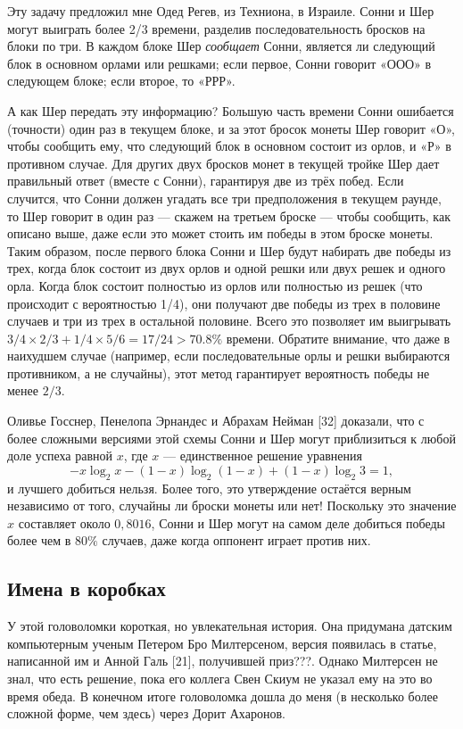 Эту задачу предложил мне Одед Регев, из Техниона, в Израиле.
Сонни и Шер могут выиграть более 2/3 времени, разделив последовательность бросков на блоки по три.
В каждом блоке Шер \emph{сообщает} Сонни, является ли следующий блок в основном орлами или решками;
если первое, Сонни говорит «ООО» в следующем блоке; если второе, то «РРР».

А как Шер передать эту информацию?
Большую часть времени Сонни ошибается (точности) один раз в текущем блоке, и за этот бросок монеты Шер говорит «О», чтобы сообщить ему, что следующий блок в основном состоит из орлов, и «Р» в противном случае.
Для других двух бросков монет в текущей тройке Шер дает правильный ответ (вместе с Сонни), гарантируя две из трёх побед.
Если случится, что Сонни должен угадать все три предположения в текущем раунде, то Шер говорит в один раз --- скажем на третьем броске --- чтобы сообщить, как описано выше, даже если это может стоить им победы в этом броске монеты.
Таким образом, после первого блока Сонни и Шер будут набирать две победы из трех, когда блок состоит из двух орлов и одной решки или двух решек и одного орла.
Когда блок состоит полностью из орлов или полностью из решек (что происходит с вероятностью 1/4), они получают две победы из трех в половине случаев и три из трех в остальной половине.
Всего это позволяет им выигрывать $3/4 \times 2/3 + 1/4 \times 5/6 = 17/24 > 70.8\%$ времени.
Обратите внимание, что даже в наихудшем случае (например, если последовательные орлы и решки выбираются противником, а не случайны), этот метод гарантирует вероятность победы не менее $2/3$.

Оливье Госснер, Пенелопа Эрнандес и Абрахам Нейман [32] доказали, что с более сложными версиями этой схемы Сонни и Шер могут приблизиться к любой доле успеха равной $x$, где $x$ --- единственное решение уравнения
\[-x \log_2 x - (1 - x) \log_2 (1 - x) + (1 - x) \log_2 3 = 1,\]
и лучшего добиться нельзя.
Более того, это утверждение остаётся верным независимо от того, случайны ли броски монеты или нет!
Поскольку это значение $x$ составляет около $0{,}8016$, Сонни и Шер могут на самом деле добиться победы более чем в $80\%$ случаев, даже когда оппонент играет против них.

\subsection*{Имена в коробках}

У этой головоломки короткая, но увлекательная история.
Она придумана датским компьютерным ученым Петером Бро Милтерсеном, версия появилась в статье, написанной им и Анной Галь [21], получившей приз???.
Однако Милтерсен не знал, что есть решение, пока его коллега Свен Скиум не указал ему на это во время обеда.
В конечном итоге головоломка дошла до меня (в несколько более сложной форме, чем здесь) через Дорит Ахаронов.

